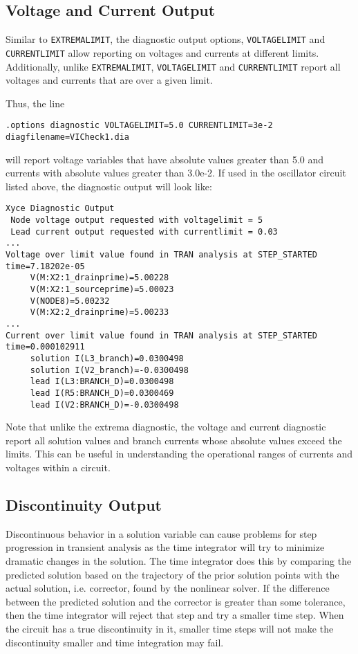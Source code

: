 \subsection{Voltage and Current Output}
Similar to \texttt{EXTREMALIMIT}, the diagnostic output options, \texttt{VOLTAGELIMIT} and
\texttt{CURRENTLIMIT} allow reporting on voltages and currents at different limits.  Additionally,
unlike \texttt{EXTREMALIMIT}, \texttt{VOLTAGELIMIT} and \texttt{CURRENTLIMIT} report all 
voltages and currents that are over a given limit.  

Thus, the line
\begin{verbatim}
.options diagnostic VOLTAGELIMIT=5.0 CURRENTLIMIT=3e-2 diagfilename=VICheck1.dia
\end{verbatim}
will report voltage variables that have absolute values greater than 5.0 and currents
with absolute values greater than 3.0e-2.  If used in the oscillator circuit listed above, 
the diagnostic output will look like:

\begin{verbatim}
Xyce Diagnostic Output
 Node voltage output requested with voltagelimit = 5
 Lead current output requested with currentlimit = 0.03
...
Voltage over limit value found in TRAN analysis at STEP_STARTED time=7.18202e-05
     V(M:X2:1_drainprime)=5.00228
     V(M:X2:1_sourceprime)=5.00023
     V(NODE8)=5.00232
     V(M:X2:2_drainprime)=5.00233
...
Current over limit value found in TRAN analysis at STEP_STARTED time=0.000102911
     solution I(L3_branch)=0.0300498
     solution I(V2_branch)=-0.0300498
     lead I(L3:BRANCH_D)=0.0300498
     lead I(R5:BRANCH_D)=0.0300469
     lead I(V2:BRANCH_D)=-0.0300498
\end{verbatim}

Note that unlike the extrema diagnostic, the voltage and current diagnostic report all 
solution values and branch currents whose absolute values exceed the limits.  This can
be useful in understanding the operational ranges of currents and voltages within a circuit.

\subsection{Discontinuity Output}
Discontinuous behavior in a solution variable can cause problems for step progression 
in transient analysis as the time integrator will try to minimize dramatic changes 
in the solution.  The time integrator does this by comparing the predicted solution 
based on the trajectory of the prior solution points with the actual solution, i.e. corrector, 
found by the nonlinear solver.  If the difference between the predicted solution and the corrector 
is greater than some tolerance, then the time integrator
will reject that step and try a smaller time step.  When the circuit has a true 
discontinuity in it, smaller time steps will not make the discontinuity smaller and 
time integration may fail.

